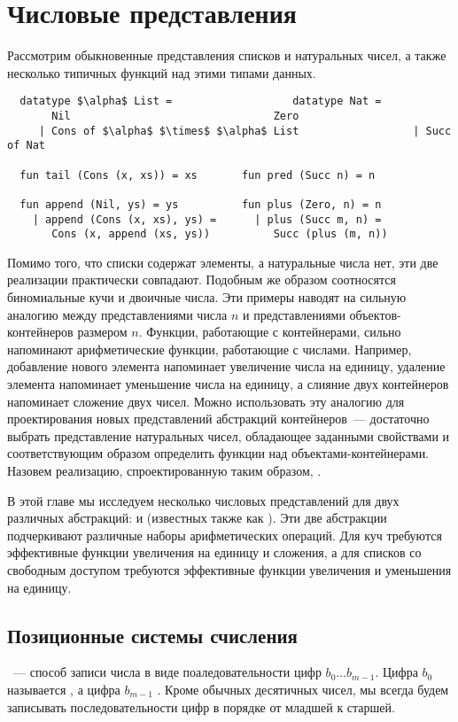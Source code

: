 \chapter{Числовые представления}
\label{ch:9}

Рассмотрим обыкновенные представления списков и натуральных чисел, а
также несколько типичных функций над этими типами данных.
\begin{lstlisting}
  datatype $\alpha$ List =                   datatype Nat =
       Nil                                Zero
     | Cons of $\alpha$ $\times$ $\alpha$ List                  | Succ of Nat

  fun tail (Cons (x, xs)) = xs       fun pred (Succ n) = n

  fun append (Nil, ys) = ys          fun plus (Zero, n) = n
    | append (Cons (x, xs), ys) =      | plus (Succ m, n) =
       Cons (x, append (xs, ys))          Succ (plus (m, n))
\end{lstlisting}
Помимо того, что списки содержат элементы, а натуральные числа нет,
эти две реализации практически совпадают. Подобным же образом
соотносятся биномиальные кучи и двоичные числа. Эти примеры наводят на
сильную аналогию между представлениями числа $n$ и представлениями
объектов-контейнеров размером $n$. Функции, работающие с контейнерами,
сильно напоминают арифметические функции, работающие с
числами. Например, добавление нового элемента напоминает увеличение
числа на единицу, удаление элемента напоминает уменьшение числа на
единицу, а слияние двух контейнеров напоминает сложение двух
чисел. Можно использовать эту аналогию для проектирования новых
представлений абстракций контейнеров~--- достаточно выбрать
представление натуральных чисел, обладающее заданными свойствами и
соответствующим образом определить функции над
объектами-контейнерами. Назовем реализацию, спроектированную таким
образом, .

В этой главе мы исследуем несколько числовых представлений для двух
различных абстракций:  и  (известных также как ). Эти две абстракции подчеркивают различные наборы
арифметических операций. Для куч требуются эффективные функции
увеличения на единицу и сложения, а для списков со свободным доступом
требуются эффективные функции увеличения и уменьшения на единицу.

\section{Позиционные системы счисления}
\label{sc:9.1}

\cite{Knuth1973b}~--- способ записи числа в виде поаледовательности
цифр $b_0\ldots b_{m-1}$. Цифра $b_0$ называется , а цифра $b_{m-1}$ . Кроме обычных десятичных чисел, мы всегда будем
записывать последовательности цифр в порядке от младшей к старшей.

